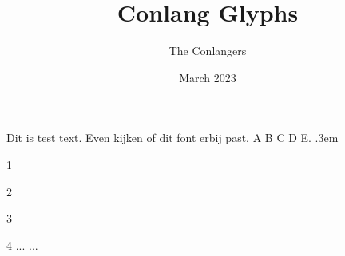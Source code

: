\documentclass[12pt]{article}
\title{Conlang Glyphs}
\author{The Conlangers}
\date{March 2023}
\begin{document}
\maketitle
\def\thickness{15pt}

\thispagestyle{empty}



%


\large Dit is test text. Even kijken of dit font erbij past. A B C D E. 
\def\Ka{\lower.3em\hbox{\DeclareLetter{\LV}{\CH}}}
\Ka

1
\DeclareLetter{\LV}{\CH}
\DeclareLetter{\LV}{\TopHorizontal}
\DeclareLetter{\RightVertical}{\TopHorizontal}
\DeclareLetter{\BottomHorizontal}{\CenterVertical}
\DeclareLetter{\BottomHorizontal}{\RightVertical}
\DeclareLetter{\BottomHorizontal}{\RightVertical}
\DeclareLetter{\BottomHorizontal}{\LeftVertical}
\DeclareLetter{\LeftVertical}{\CenterHorizontal}
\DeclareLetter{\RightVertical}{\CenterHorizontal}
\DeclareLetter{\CenterVertical}{\CenterHorizontal}

2
\DeclareLetter{\RightCenterDiagonal}{\TopHorizontal}
\DeclareLetter{\RightCenterDiagonal}{\LeftTopHorizontal}
\DeclareLetter{\RightCenterDiagonal}{\LeftCenterHorizontal}
\DeclareLetter{\RightCenterDiagonal}{\LeftBottomHorizontal}
\DeclareLetter{\RightCenterDiagonal}{\BottomHorizontal}
\DeclareLetter{\RightCenterDiagonal}{\RightCenterHorizontal}
\DeclareLetter{\RightCenterDiagonal}{\RightTopHorizontal}
\DeclareLetter{\RightCenterDiagonal}{\CenterHorizontal}

3
\DeclareLetter{\LeftCenterDiagonal}{\TopHorizontal}
\DeclareLetter{\LeftCenterDiagonal}{\RightTopHorizontal}
\DeclareLetter{\LeftCenterDiagonal}{\RightCenterHorizontal}
\DeclareLetter{\LeftCenterDiagonal}{\RightBottomHorizontal}
\DeclareLetter{\LeftCenterDiagonal}{\BottomHorizontal}
\DeclareLetter{\LeftCenterDiagonal}{\LeftCenterHorizontal}
\DeclareLetter{\LeftCenterDiagonal}{\LeftTopHorizontal}
\DeclareLetter{\LeftCenterDiagonal}{\CenterHorizontal}

4
\DeclareLetter{\ArchBottomRight}{\UpperHorizontal}
\DeclareLetter{\ArchBottomRight}{\QRightUpperHorizontal}
\DeclareLetter{\ArchBottomRight}{\LeftLowerHorizontal}
\DeclareLetter{\ArchBottomRight}{\RightLeftBottomHorizontal}
\DeclareLetter{\ArchBottomRight}{\BottomHorizontal}
\DeclareLetter{\ArchBottomRight}{\LeftRightBottomHorizontal}
\DeclareLetter{\ArchBottomRight}{\LeftLowerHorizontal}
\DeclareLetter{\ArchBottomRight}{\OuterRightUpperHorizontal}
\DeclareLetter{\ArchBottomRight}{\CenterHorizontal}
...
...
\end{document}
